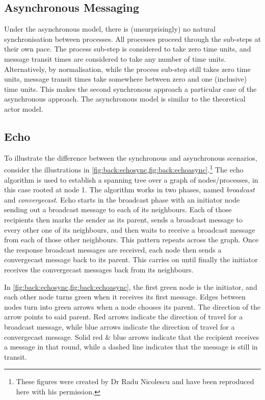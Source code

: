 \subsection{Asynchronous Messaging}
Under the asynchronous model, there is (unsurprisingly) no natural synchronisation between processes.  All processes proceed through the sub-steps at their own pace.  The \textsf{process} sub-step is considered to take zero time units, and message transit times are considered to take any number of time units.  Alternatively, by normalisation, while the \textsf{process} sub-step still takes zero time units, message transit times take somewhere between zero and one (inclusive) time units.  This makes the second synchronous approach a particular case of the asynchronous approach.  The asynchronous model is similar to the theoretical \gls{actor} model.

\subsection{Echo}
To illustrate the difference between the synchronous and asynchronous scenarios, consider the illustrations in \cref{fig:back:echosync,fig:back:echoasync}.\footnote{These figures were created by Dr Radu Nicolescu and have been reproduced here with his permission.}  The \textsf{echo} algorithm \cite[Ch.~4.3]{Fokkink2013} is used to establish a spanning tree over a graph of nodes/processes, in this case rooted at node 1.  The algorithm works in two phases, named \emph{broadcast} and \emph{convergecast}.  \textsf{Echo} starts in the broadcast phase with an initiator node sending out a broadcast message to each of its neighbours.  Each of those recipients then marks the sender as its parent, sends a broadcast message to every other one of its neighbours, and then waits to receive a broadcast message from each of those other neighbours.  This pattern repeats across the graph.  Once the response broadcast messages are received, each node then sends a convergecast message back to its parent.  This carries on until finally the initiator receives the convergecast messages back from its neighbours.

In \cref{fig:back:echosync,fig:back:echoasync}, the first green node is the initiator, and each other node turns green when it receives its first message.  Edges between nodes turn into green arrows when a node chooses its parent.  The direction of the arrow points to said parent.  Red arrows indicate the direction of travel for a broadcast message, while blue arrows indicate the direction of travel for a convergecast message.  Solid red \& blue arrows indicate that the recipient receives a message in that round, while a dashed line indicates that the message is still in transit.

